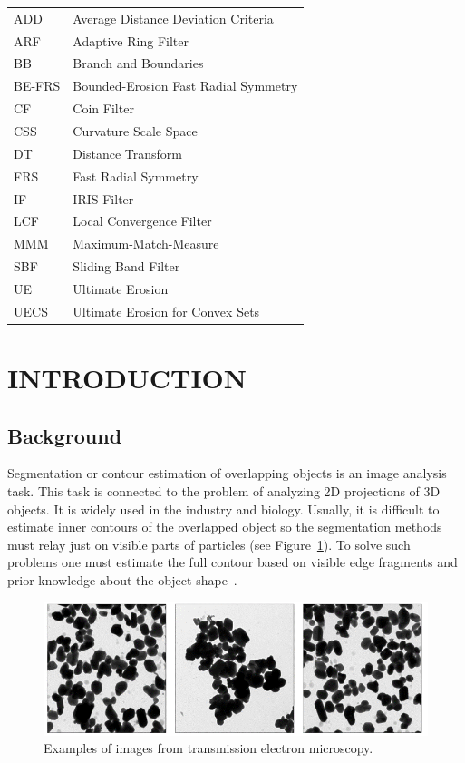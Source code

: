 \documentclass{lutmscthesis}[2010/09/22]
\begin{document}
\begin{tabular}{l l}
ADD &  Average Distance Deviation Criteria\\
ARF & Adaptive Ring Filter\\
BB & Branch and Boundaries\\
BE-FRS & Bounded-Erosion Fast Radial Symmetry\\
CF & Coin Filter\\
CSS & Curvature Scale Space \\
DT & Distance Transform \\
FRS & Fast Radial Symmetry \\
IF & IRIS Filter\\
LCF & Local Convergence Filter\\
MMM & Maximum-Match-Measure\\
SBF & Sliding Band Filter\\
UE & Ultimate Erosion\\
UECS & Ultimate Erosion for Convex Sets\\
\end{tabular}



\setlength{\parskip}{3ex}



\section{INTRODUCTION}
\label{sec:introduction}

\subsection{Background}
\label{sec:background}

Segmentation or contour estimation of overlapping objects is an image analysis task. This task is connected to the problem of analyzing 2D projections of 3D objects. It is widely used in the industry and biology. Usually, it is difficult to estimate inner contours of the overlapped object so the segmentation methods must relay just on visible parts of particles (see Figure~\ref{fig:real_data}). To solve such problems one must estimate the full contour based on visible edge fragments and prior knowledge about the object shape~\cite{zafari-thesis}.

\begin{figure}[ht]
  \includegraphics[width=\linewidth]{real_data.png}
  \caption{Examples of images from transmission electron microscopy.}
  \label{fig:real_data}
\end{figure}
\end{document}
